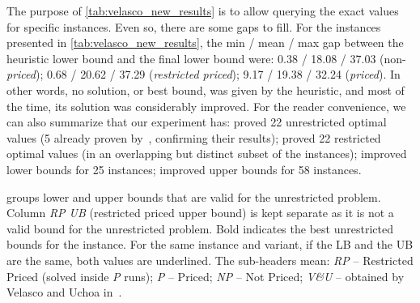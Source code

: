 \documentclass[ppgc,prop-tese,english,formais,babel]{iiufrgs}
\begin{document}
The purpose of \cref{tab:velasco_new_results} is to allow querying the exact values for specific instances.
Even so, there are some gaps to fill.
For the instances presented in \cref{tab:velasco_new_results},
the min / mean / max gap between the heuristic lower bound and the final lower bound were: 0.38 / 18.08 / 37.03 (non-\emph{priced}); 0.68 / 20.62 / 37.29 (\emph{restricted priced}); 9.17 / 19.38 / 32.24 (\emph{priced}).
In other words, no solution, or best bound, was given by the heuristic, and most of the time, its solution was considerably improved.
For the reader convenience, we can also summarize that our experiment has:
proved 22 unrestricted optimal values (5 already proven by~\citet{velasco:2019}, confirming their results);
proved 22 restricted optimal values (in an overlapping but distinct subset of the instances);
improved lower bounds for 25 instances;
improved upper bounds for 58 instances.

 groups lower and upper bounds that are valid for the unrestricted problem.
Column \emph{RP UB} (restricted priced upper bound) is kept separate as it is not a valid bound for the unrestricted problem.
Bold indicates the best unrestricted bounds for the instance.
For the same instance and variant, if the LB and the UB are the same, both values are underlined.
The sub-headers mean:
\emph{RP} -- Restricted Priced (solved inside \emph{P} runs);
\emph{P} -- Priced;
\emph{NP} -- Not Priced;
\emph{V\&U} -- obtained by Velasco and Uchoa in~\citet{velasco:2019}.
\end{document}
